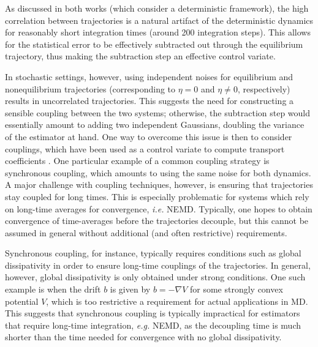 As discussed in both works \cite{ciccotti75,ciccotti79} (which consider a deterministic framework), the high correlation between trajectories is a natural artifact of the deterministic dynamics for reasonably short integration times (around 200 integration steps). This allows for the statistical error to be effectively subtracted out through the equilibrium trajectory, thus making the subtraction step an effective control variate.

In stochastic settings, however, using independent noises for equilibrium and nonequilibrium trajectories (corresponding to $\eta=0$ and $\eta\ne 0$, respectively) results in uncorrelated trajectories. This suggests the need for constructing a sensible coupling between the two systems; otherwise, the subtraction step would essentially amount to adding two independent Gaussians, doubling the variance of the estimator at hand. One way to overcome this issue is then to consider couplings, which have been used as a control variate to compute transport coefficients \cite{goodman2009,garnier2022}. One particular example of a common coupling strategy is synchronous coupling, which amounts to using the same noise for both dynamics. A major challenge with coupling techniques, however, is ensuring that trajectories stay coupled for long times.
This is especially problematic for systems which rely on long-time averages for convergence, \emph{i.e.} NEMD. Typically, one hopes to obtain convergence of time-averages before the trajectories decouple, but this cannot be assumed in general without additional (and often restrictive) requirements.

Synchronous coupling, for instance, typically requires conditions such as global dissipativity in order to ensure long-time couplings of the trajectories. In general, however, global dissipativity is only obtained under strong conditions. One such example is when the drift $b$ is given by $b=-\nabla V$ for some strongly convex potential $V$, which is too restrictive a requirement for actual applications in MD. This suggests that synchronous coupling is typically impractical for estimators that require long-time integration, \emph{e.g.} NEMD, as the decoupling time is much shorter than the time needed for convergence with no global dissipativity.  


